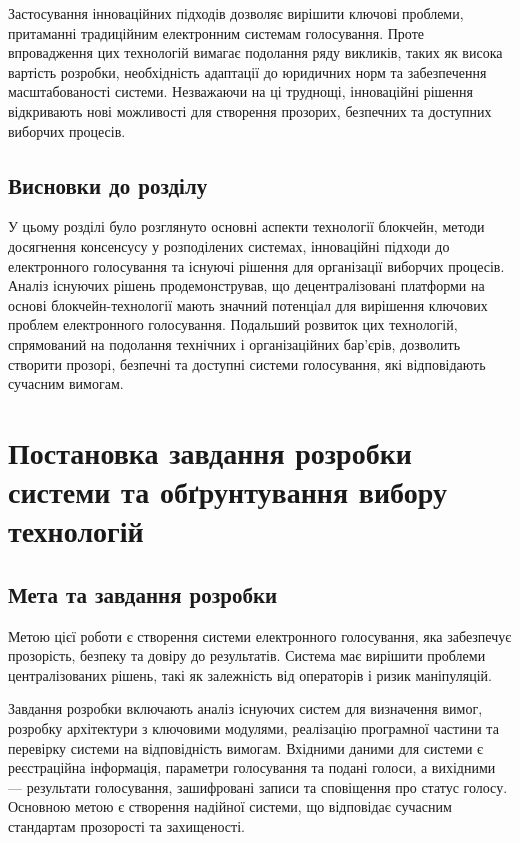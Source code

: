 \documentclass[14pt]{extreport}
\begin{document}
  Застосування інноваційних підходів дозволяє вирішити ключові проблеми, притаманні традиційним електронним системам голосування. Проте впровадження цих технологій вимагає подолання ряду викликів, таких як висока вартість розробки, необхідність адаптації до юридичних норм та забезпечення масштабованості системи. Незважаючи на ці труднощі, інноваційні рішення відкривають нові можливості для створення прозорих, безпечних та доступних виборчих процесів.
  
  \section{Висновки до розділу}
  
  У цьому розділі було розглянуто основні аспекти технології блокчейн, методи досягнення консенсусу у розподілених системах, інноваційні підходи до електронного голосування та існуючі рішення для організації виборчих процесів. Аналіз існуючих рішень продемонстрував, що децентралізовані платформи на основі блокчейн-технології мають значний потенціал для вирішення ключових проблем електронного голосування. Подальший розвиток цих технологій, спрямований на подолання технічних і організаційних бар’єрів, дозволить створити прозорі, безпечні та доступні системи голосування, які відповідають сучасним вимогам.
  
  \chapter{Постановка завдання розробки системи та обґрунтування вибору технологій}

  \section{Мета та завдання розробки}
  
  Метою цієї роботи є створення системи електронного голосування, яка забезпечує прозорість, безпеку та довіру до результатів. Система має вирішити проблеми централізованих рішень, такі як залежність від операторів і ризик маніпуляцій.

  Завдання розробки включають аналіз існуючих систем для визначення вимог, розробку архітектури з ключовими модулями, реалізацію програмної частини та перевірку системи на відповідність вимогам. Вхідними даними для системи є реєстраційна інформація, параметри голосування та подані голоси, а вихідними — результати голосування, зашифровані записи та сповіщення про статус голосу. Основною метою є створення надійної системи, що відповідає сучасним стандартам прозорості та захищеності.
  
\end{document}
